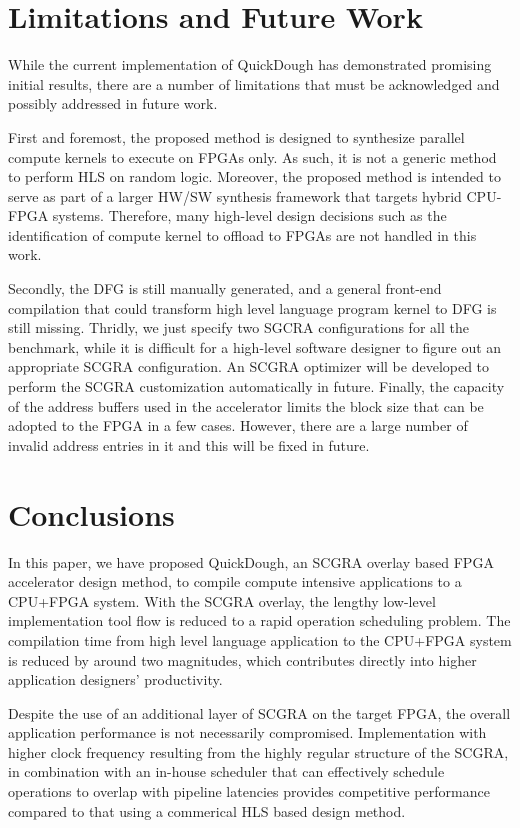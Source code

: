 \section{Limitations and Future Work}\label{sec:discussion}
While the current implementation of QuickDough has demonstrated promising initial results, there are a number of limitations that must be acknowledged and possibly addressed in future work.

First and foremost, the proposed method is designed to synthesize parallel compute kernels to execute on FPGAs only. As such, it is not a generic method to perform HLS on random logic. Moreover, the proposed method is intended to serve as part of a larger HW/SW synthesis framework that targets hybrid CPU-FPGA systems. Therefore, many high-level design decisions such as the identification of compute kernel to offload to FPGAs are not handled in this work. 

Secondly, the DFG is still manually generated, and a general front-end compilation that could transform high level language program kernel to DFG is still missing. Thridly, we just specify two SGCRA configurations for all the benchmark, while it is difficult for a high-level software designer to figure out an appropriate SCGRA configuration. An SCGRA optimizer will be developed to perform the SCGRA customization automatically in future. Finally, the capacity of the address buffers used in the accelerator limits the block size that can be adopted to the FPGA in a few cases. However, there are a large number of invalid address entries in it and this will be fixed in future. 

\section{Conclusions}\label{sec:conclusions}
In this paper, we have proposed QuickDough, an SCGRA overlay based FPGA accelerator design method, to compile compute intensive applications to a CPU+FPGA system. With the SCGRA overlay, the lengthy low-level implementation tool flow is reduced to a rapid operation scheduling problem. The compilation time from high level language application to the CPU+FPGA system is reduced by around two magnitudes, which contributes directly into higher application designers' productivity.

Despite the use of an additional layer of SCGRA on the target FPGA, the overall application performance is not necessarily compromised. Implementation with higher clock frequency resulting from the highly regular structure of the SCGRA, in combination with an in-house scheduler that can effectively schedule operations to overlap with pipeline latencies provides competitive performance compared to that using a commerical HLS based design method.
